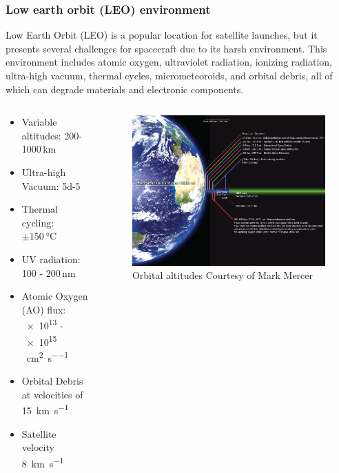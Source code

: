 \documentclass[10pt]{beamer}
\begin{document}
\begin{frame}[label=LEO]
\frametitle{Low earth orbit (LEO) environment}
Low Earth Orbit (LEO) is a popular location for satellite launches, but it presents several challenges for spacecraft due to its harsh environment. This environment includes atomic oxygen, ultraviolet radiation, ionizing radiation, ultra-high vacuum, thermal cycles, micrometeoroids, and orbital debris, all of which can degrade materials and electronic components. 

\begin{columns}
\begin{column}{0.5\textwidth}
\begin{itemize}
\item Variable altitudes:  200-1000\,\si{\kilo\meter}
\item Ultra-high Vacuum: \SI{5d-5}{\torr}
\item Thermal cycling: $\pm\SI{150}{\degreeCelsius}$
\item UV radiation: 100 - 200\,\si{\nano\meter}
\item Atomic Oxygen (AO) flux: \num{e13} - \num{e15}\,\si[per-mode = fraction]{\at\per\centi\meter\squared\per\second}
\item Orbital Debris at velocities of \SI[per-mode = fraction]{15}{\kilo\meter\per\second}
\item Satellite velocity \SI[per-mode = fraction]{8}{\kilo\meter\per\second}
\end{itemize}
\end{column}
\begin{column}{0.5\textwidth}
\begin{figure}[H]
\centering
\includegraphics[width=0.9\linewidth]{figures/LEO}
\caption{Orbital altitudes {\tiny Courtesy of Mark Mercer}}
\label{fig:leo}
\end{figure}
\end{column}
\end{columns}				
\end{frame}
\end{document}
